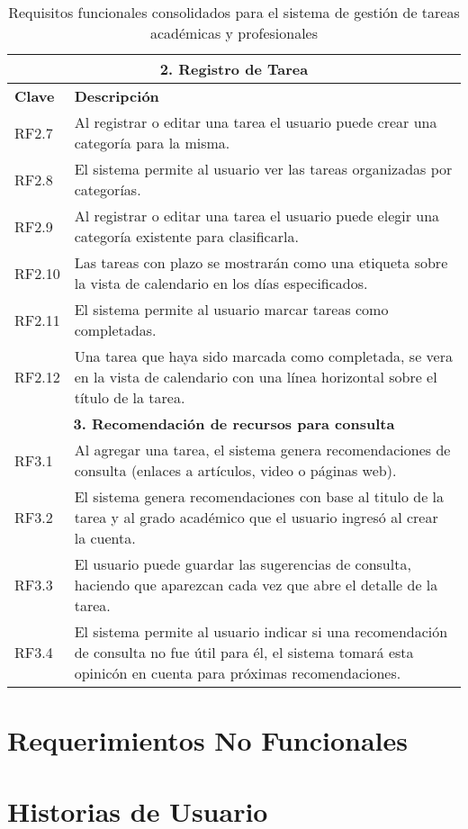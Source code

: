 \documentclass[11pt]{article}
\begin{document}
\begin{table}[H]
    \centering
    \begin{tabular}{|p{2cm}|p{13cm}|}
    \hline
    \multicolumn{2}{|c|}{\textbf{2. Registro de Tarea}} \\
    \hline
    \textbf{Clave} & \textbf{Descripción } \\
    \hline
    RF2.7 & Al registrar o editar una tarea el usuario puede crear una categoría para la misma.\\
    \hline
    RF2.8 & El sistema permite al usuario ver las tareas organizadas por categorías. \\
    \hline
    RF2.9 & Al registrar o editar una tarea el usuario puede elegir una categoría existente para clasificarla.\\
    \hline
    RF2.10 & Las tareas con plazo se mostrarán como una etiqueta sobre la vista de calendario en los días especificados.\\
    \hline
    RF2.11 & El sistema permite al usuario marcar tareas como completadas. \\
    \hline
    RF2.12 & Una tarea que haya sido marcada como completada, se vera en la vista de calendario con una línea horizontal sobre el título de la tarea.\\
    \hline
    \multicolumn{2}{|c|}{\textbf{3. Recomendación de recursos para consulta}} \\
    \hline
    RF3.1 & Al agregar una tarea, el sistema genera recomendaciones de consulta (enlaces a artículos, video o páginas web).  \\
    \hline
    RF3.2 & El sistema genera recomendaciones con base al titulo de la tarea y al grado académico que el usuario ingresó al crear la cuenta.\\   
    \hline
    RF3.3 & El usuario puede guardar las sugerencias de consulta, haciendo que aparezcan cada vez que abre el detalle de la tarea.\\
    \hline
    RF3.4 & El sistema permite al usuario indicar si una recomendación de consulta no fue útil para él, el sistema tomará esta opinicón en
    cuenta para próximas recomendaciones. \\
    \hline
    \end{tabular}
    \caption{Requisitos funcionales consolidados para el sistema de gestión de tareas académicas y profesionales}
    \label{tab:requisitos-funcionales-2}
\end{table}
\pagebreak

\section{Requerimientos No Funcionales}


\section{Historias de Usuario}

\pagebreak
\printbibliography[heading=bibintoc]
\end{document}
